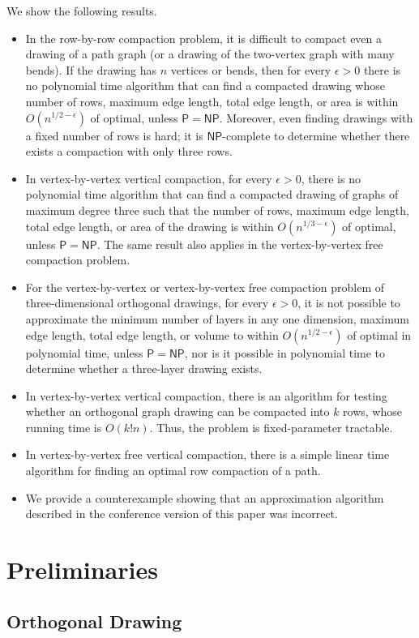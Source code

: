 \documentclass[12pt]{article}
\theoremstyle{definitions}
\renewcommand{\P}{\mathsf{P}}
\newcommand{\NP}{\mathsf{NP}}
\begin{document}
We show the following results.
\begin{itemize}
\item 
In the row-by-row compaction problem, it is difficult to compact even a
drawing of a path graph (or a drawing of the two-vertex graph with many bends).
If the drawing has $n$ vertices or bends, then for every $\epsilon>0$  there is no
polynomial time algorithm that can find a compacted drawing whose number of
rows, maximum edge length, total edge length, or area is within
$O(n^{1/2-\epsilon})$ of optimal, unless $\P=\NP$. Moreover, even
finding drawings with a fixed number of rows is hard; it is $\NP$-complete
to determine whether there exists a compaction with only three rows.
\item 
In vertex-by-vertex vertical compaction, for every $\epsilon>0$, there is no
polynomial time algorithm that can find a compacted drawing of graphs of maximum degree three such that the number of
rows, maximum edge length, total edge length, or area of the drawing is within
$O(n^{1/3-\epsilon})$ of optimal, unless $\P=\NP$. The same result also applies in the
vertex-by-vertex free compaction problem.
\newpage \item 
For the vertex-by-vertex or vertex-by-vertex free compaction problem of  three-dimensional
orthogonal drawings, for every $\epsilon>0$, it is not possible to approximate the
minimum number of layers in any one dimension, maximum edge length, total edge length, or volume to within $O(n^{1/2-\epsilon})$ of
optimal in polynomial time, unless $\P=\NP$, nor is it possible in
polynomial time to determine whether a three-layer drawing exists.
\item 
In vertex-by-vertex vertical compaction, there is an algorithm for testing
whether an orthogonal graph drawing can be compacted into $k$ rows, whose
running time is $O(k! n)$. Thus, the problem is fixed-parameter tractable.
\item 
In vertex-by-vertex free vertical compaction, there is a simple linear time algorithm for finding an optimal row compaction of a path.
\item
We provide a counterexample showing that an approximation algorithm described in the conference version of this paper was incorrect.
\end{itemize}

\section{Preliminaries}
\subsection{Orthogonal Drawing}
\end{document}
